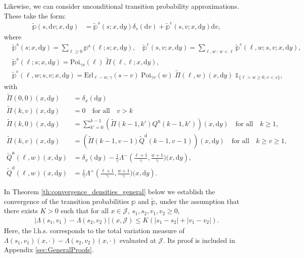 \documentclass[11pt,leqno]{amsart}
\numberwithin{table}{section}
\numberwithin{figure}{section}
\numberwithin{equation}{section}
\newcommand{\dd}{\mathrm{d}}
\newcommand{\1}{{\mathds{1}}}
\newcommand{\0}{\mat{0}}
\newcommand{\ap}[1]{\mathbb{#1}}
\newcommand{\tld}[1]{\widetilde{#1}}
\newcommand{\apt}[1]{\tld{\mathbb{#1}}}
\begin{document}
{{Likewise, we can consider unconditional transition probability approximations. These take the form:
\begin{align*}
\apt{p}(s,\dd v; x,\dd y) & = \apt{p}^{\mathrm{a}}(s; x,\dd y)\delta_{s}(\dd v) + \apt{p}^{\mathrm{c}}(s, v; x,\dd y)\dd v,
\end{align*}
where
\begin{align*} 
&\apt{p}^{\mathrm{a}}(s; x,\dd y) = \sum_{\ell\ge 0} \ap{p}^{\mathrm{a}}(\ell; s; x,\dd y),\quad\apt{p}^{\mathrm{c}}(s,v; x,\dd y) = \sum_{\ell, w\,:\, w< \ell} \apt{p}^{\mathrm{c}}(\ell,w;s,v; x,\dd y),\\
&\apt{p}^{\mathrm{a}}(\ell; s;x,\dd y)= \mathrm{Poi}_{\gamma s}(\ell)\; \tld{\Pi}(\ell, \ell;x,\dd y),\\
&\apt{p}^{\mathrm{c}}(\ell,w;s,v; x,\dd y) = \mathrm{Erl}_{\ell-w,\gamma}(s-v) \; \mathrm{Poi}_{\gamma v} (w)\; \tld{\Pi}(\ell, w)(x,\dd y)\;\mathds{1}_{\{\ell>w\ge 0, v<s\}},
\end{align*}
with
\begin{align*}
\tld{\Pi}(0,0)(x,\dd y)&=\delta_x(\dd y)\\
\tld{\Pi}(k,v)(x,\dd y)&={0}\quad\mbox{for all}\quad v>k\\
\tld{\Pi}(k,0)(x,\dd y)& = \sum_{k'=0}^{k-1}  \left(\tld{\Pi}(k-1,k'){Q}^{\mathrm{n}}(k-1,k')\right)(x,\dd y)\quad\mbox{for all}\quad k\ge 1,\\
\tld{\Pi}(k,v)(x,\dd y)& = \left(\tld{\Pi}(k-1,v-1)\tld{Q}^{\mathrm{d}}(k-1,v-1)\right)(x,\dd y)\quad\mbox{for all}\quad k\ge v\ge 1,\\
\tld{Q}^{\mathrm{n}}(\ell,w)(x,\dd y) &= \delta_x(\dd y)-\frac{1}{\gamma}\Lambda^-\left(\tfrac{\ell+1}{\gamma}, \tfrac{w+1}{\gamma})(x,\dd y\right),\\
\tld{Q}^{\mathrm{d}}(\ell,w)(x,\dd y) &=\frac{1}{\gamma}\Lambda^+\left(\tfrac{\ell+1}{\gamma}, \tfrac{w+1}{\gamma})(x,\dd y\right).
\end{align*}

In Theorem \ref{th:convergence_densities_general} below we establish the convergence of the transition probabilities $\ap{p}$ and $\apt{p}$, under the assumption that there exists $K>0$ such that for all $x\in\mathcal{J}$, $s_1,s_2,v_1,v_2\ge 0$, 
\begin{align}\left|\Lambda(s_1,v_1)-\Lambda(s_2,v_2)\right|(x,\mathcal{J})\le K \left(|s_1-s_2| + |v_1-v_2|\right).
\end{align}
Here, the l.h.s. corresponds to the total variation measure of $\Lambda(s_1,v_1)(x,\cdot)-\Lambda(s_2,v_2)(x,\cdot)$ evaluated at $\mathcal{J}$. Its proof is included in Appendix \ref{sec:GeneralProofs}.

}}
\end{document}
